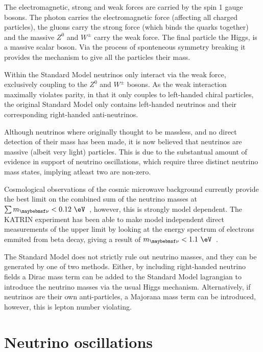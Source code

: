 The electromagnetic, strong and weak forces are carried by the spin 1 gauge bosons. The photon
carries the electromagnetic force (affecting all charged particles), the gluons carry the strong
force (which binds the quarks together) and the massive $Z^{0}$ and $W^{\pm}$ carry the weak
force. The final particle the Higgs, is a massive scalar boson. Via the process of sponteneous
symmetry breaking it provides the mechanism to give all the particles their mass.

Within the Standard Model neutrinos only interact via the weak force, exclusively coupling to the
$Z^{0}$ and $W^{\pm}$ bosons. As the weak interaction maximally violates parity, in that it only
couples to left-handed chiral particles, the original Standard Model only contains left-handed
neutrinos and their corresponding right-handed anti-neutrinos.

Although neutrinos where originally thought to be massless, and no direct detection of their mass
has been made, it is now believed that neutrinos are massive (albeit very light) particles. This
is due to the substantual amount of evidence in support of neutrino oscillations, which require
three distinct neutrino mass states, implying atleast two are non-zero.

Cosmological observations of the cosmic microwave background currently provide the best limit on
the combined sum of the neutrino masses at $\sum m_{\nu} < 0.12~\eV$~\cite{planck2018}, however,
this is strongly model dependent. The KATRIN experiment has been able to make model independent
direct measurements of the upper limit by looking at the energy spectrum of electrons emmited
from beta decay, giving a result of $m_{\nu} < 1.1~\eV$~\cite{aker2019}.

The Standard Model does not strictly rule out neutrino masses, and they can be generated by one
of two methods. Either, by including right-handed neutrino fields a Dirac mass term can be added
to the Standard Model lagrangian to introduce the neutrino masses via the usual Higgs mechanism.
Alternatively, if neutrinos are their own anti-particles, a Majorana mass term can be introduced,
however, this is lepton number violating.

\section{Neutrino oscillations}
\label{sec:theory_oscillations}

